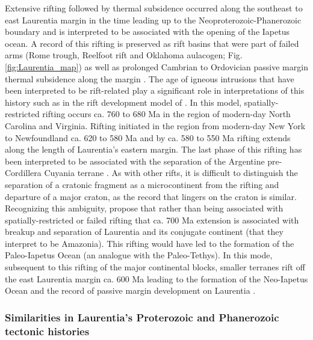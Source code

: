 \documentclass[twocolumn, switch]{article} %
\begin{document}
Extensive rifting followed by thermal subsidence occurred along the southeast to east Laurentia margin in the time leading up to the Neoproterozoic-Phanerozoic boundary and is interpreted to be associated with the opening of the Iapetus ocean. A record of this rifting is preserved as rift basins that were part of failed arms (Rome trough, Reelfoot rift and Oklahoma aulacogen; Fig. \ref{fig:Laurentia_map}) as well as prolonged Cambrian to Ordovician passive margin thermal subsidence along the margin \citep{Bond1984a, Whitmeyer2007a}. The age of igneous intrusions that have been interpreted to be rift-related play a significant role in interpretations of this history such as in the rift development model of \citet{Burton2010a}. In this model, spatially-restricted rifting occurs ca. 760 to 680 Ma in the region of modern-day North Carolina and Virginia. Rifting initiated in the region from modern-day New York to Newfoundland ca. 620 to 580 Ma and by ca. 580 to 550 Ma rifting extends along the length of Laurentia's eastern margin. The last phase of this rifting has been interpreted to be associated with the separation of the Argentine pre-Cordillera Cuyania terrane \citep{Dickerson1998a}. As with other rifts, it is difficult to distinguish the separation of a cratonic fragment as a microcontinent from the rifting and departure of a major craton, as the record that lingers on the craton is similar. Recognizing this ambiguity, \citet{Robert2020a} propose that rather than being associated with spatially-restricted or failed rifting that ca. 700 Ma extension is associated with breakup and separation of Laurentia and its conjugate continent (that they interpret to be Amazonia). This rifting would have led to the formation of the Paleo-Iapetus Ocean (an analogue with the Paleo-Tethys). In this mode, subsequent to this rifting of the major continental blocks, smaller terranes rift off the east Laurentia margin ca. 600 Ma leading to the formation of the Neo-Iapetus Ocean and the record of passive margin development on Laurentia \citep{Robert2020a}.

\subsubsection{Similarities in Laurentia's Proterozoic and Phanerozoic tectonic histories}
\end{document}
